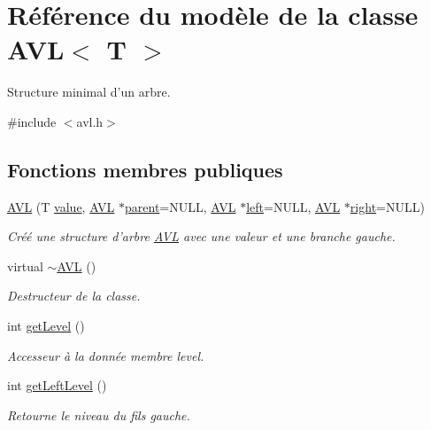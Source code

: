 \hypertarget{class_a_v_l}{\section{Référence du modèle de la classe A\+V\+L$<$ T $>$}
\label{class_a_v_l}
}


Structure minimal d'un arbre.  




{\ttfamily \#include $<$avl.\+h$>$}

\subsection*{Fonctions membres publiques}
\begin{DoxyCompactItemize}
\item 
\hyperlink{class_a_v_l_abbcd7c80b69cdf8caab9ea79b51163d9}{A\+V\+L} (T \hyperlink{class_a_v_l_a3f5c40790a92e0ebd93a187812d6b698}{value}, \hyperlink{class_a_v_l}{A\+V\+L} $\ast$\hyperlink{class_a_v_l_a3978c23794aa5e11eb37473e1cebe4e5}{parent}=N\+U\+L\+L, \hyperlink{class_a_v_l}{A\+V\+L} $\ast$\hyperlink{class_a_v_l_aa1ea6df15798ce98461729e2b1deeb87}{left}=N\+U\+L\+L, \hyperlink{class_a_v_l}{A\+V\+L} $\ast$\hyperlink{class_a_v_l_ac02dee89f769588763a80be6176af37b}{right}=N\+U\+L\+L)
\begin{DoxyCompactList}\small\item\em Créé une structure d'arbre \hyperlink{class_a_v_l}{A\+V\+L} avec une valeur et une branche gauche. \end{DoxyCompactList}\item 
virtual \hyperlink{class_a_v_l_a07d2694a7bb1f26f9990f01acf29c5af}{$\sim$\+A\+V\+L} ()
\begin{DoxyCompactList}\small\item\em Destructeur de la classe. \end{DoxyCompactList}\item 
int \hyperlink{class_a_v_l_a2c7b07714a761de62798b87856d5827a}{get\+Level} ()
\begin{DoxyCompactList}\small\item\em Accesseur à la donnée membre level. \end{DoxyCompactList}\item 
int \hyperlink{class_a_v_l_af8991c233258f711d45560206fe9e4cb}{get\+Left\+Level} ()
\begin{DoxyCompactList}\small\item\em Retourne le niveau du fils gauche. \end{DoxyCompactList}\item 

\end{DoxyCompactItemize}

